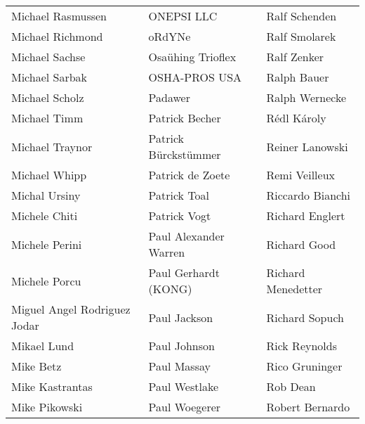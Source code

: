\begin{tabular}{p{4.5cm}p{4.5cm}p{4.5cm}}
Michael Rasmussen & ONEPSI LLC & Ralf Schenden \\
Michael Richmond & oRdYNe & Ralf Smolarek \\
Michael Sachse & Osaühing Trioflex & Ralf Zenker \\
Michael Sarbak & OSHA-PROS USA & Ralph Bauer \\
Michael Scholz & Padawer & Ralph Wernecke \\
Michael Timm & Patrick Becher & Rédl Károly \\
Michael Traynor & Patrick Bürckstümmer & Reiner Lanowski \\
Michael Whipp & Patrick de Zoete & Remi Veilleux \\
Michal Ursiny & Patrick Toal & Riccardo Bianchi \\
Michele Chiti & Patrick Vogt & Richard Englert \\
Michele Perini & Paul Alexander Warren & Richard Good \\
Michele Porcu & Paul Gerhardt (KONG) & Richard Menedetter \\
Miguel Angel Rodriguez Jodar & Paul Jackson & Richard Sopuch \\
Mikael Lund & Paul Johnson & Rick Reynolds \\
Mike Betz & Paul Massay & Rico Gruninger \\
Mike Kastrantas & Paul Westlake & Rob Dean \\
Mike Pikowski & Paul Woegerer & Robert Bernardo \\
\end{tabular}
\newpage
\setlength{\tabcolsep}{1mm}

